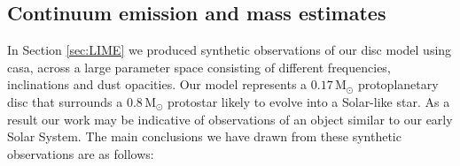 \documentclass[fleqn,usenatbib]{mnras}
\newcommand{\casa}{{\sc casa}}
\begin{document}
\smallskip

\subsection{Continuum emission and mass estimates}

In Section \ref{sec:LIME} we produced synthetic observations of our disc model using \casa, across a large parameter space consisting of different frequencies, inclinations and dust opacities. Our model represents a $0.17\,\mathrm{M}_{\odot}$ protoplanetary disc that surrounds a $0.8\,\mathrm{M}_{\odot}$ protostar likely to evolve into a Solar-like star. As a result our work may be indicative of observations of an object similar to our early Solar System. The main conclusions we have drawn from these synthetic observations are as follows:
\end{document}

